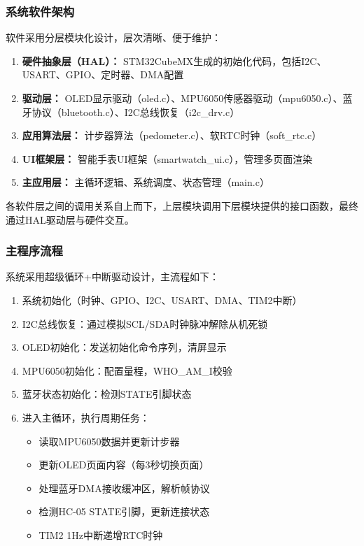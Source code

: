 \subsubsection{系统软件架构}
软件采用分层模块化设计，层次清晰、便于维护：
\begin{enumerate}
    \item \textbf{硬件抽象层（HAL）：} STM32CubeMX生成的初始化代码，包括I2C、USART、GPIO、定时器、DMA配置
    \item \textbf{驱动层：} OLED显示驱动（oled.c）、MPU6050传感器驱动（mpu6050.c）、蓝牙协议（bluetooth.c）、I2C总线恢复（i2c\_drv.c）
    \item \textbf{应用算法层：} 计步器算法（pedometer.c）、软RTC时钟（soft\_rtc.c）
    \item \textbf{UI框架层：} 智能手表UI框架（smartwatch\_ui.c），管理多页面渲染
    \item \textbf{主应用层：} 主循环逻辑、系统调度、状态管理（main.c）
\end{enumerate}

各软件层之间的调用关系自上而下，上层模块调用下层模块提供的接口函数，最终通过HAL驱动层与硬件交互。

\FloatBarrier

\subsubsection{主程序流程}
系统采用超级循环+中断驱动设计，主流程如下：
\begin{enumerate}
    \item 系统初始化（时钟、GPIO、I2C、USART、DMA、TIM2中断）
    \item I2C总线恢复：通过模拟SCL/SDA时钟脉冲解除从机死锁
    \item OLED初始化：发送初始化命令序列，清屏显示
    \item MPU6050初始化：配置量程，WHO\_AM\_I校验
    \item 蓝牙状态初始化：检测STATE引脚状态
    \item 进入主循环，执行周期任务：
    \begin{itemize}
        \item 读取MPU6050数据并更新计步器
        \item 更新OLED页面内容（每3秒切换页面）
        \item 处理蓝牙DMA接收缓冲区，解析帧协议
        \item 检测HC-05 STATE引脚，更新连接状态
        \item TIM2 1Hz中断递增RTC时钟
    \end{itemize}
\end{enumerate}

